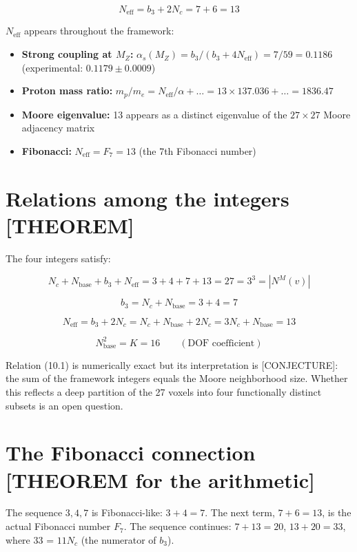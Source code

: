 \documentclass[
  11pt,
  letterpaper,
  twoside,
  openany]{book}
\makeatletter
\providecommand{\tightlist}{%
  \setlength{\itemsep}{0pt}\setlength{\parskip}{0pt}}
\let\orig@section\section
\renewcommand{\section}{\needspace{8\baselineskip}\orig@section}
\makeatother
\begin{document}
\[
N_{\text{eff}} = b_3 + 2N_c = 7 + 6 = 13
\]

\(N_{\text{eff}}\) appears throughout the framework:

\begin{itemize}
\tightlist
\item
  \textbf{Strong coupling at \(M_Z\):}
  \(\alpha_s(M_Z) = b_3 / (b_3 + 4N_{\text{eff}}) = 7/59 = 0.1186\)
  (experimental: \(0.1179 \pm 0.0009\))
\item
  \textbf{Proton mass ratio:}
  \(m_p/m_e = N_{\text{eff}}/\alpha + \ldots = 13 \times 137.036 + \ldots = 1836.47\)
\item
  \textbf{Moore eigenvalue:} 13 appears as a distinct eigenvalue of the
  \(27 \times 27\) Moore adjacency matrix
\item
  \textbf{Fibonacci:} \(N_{\text{eff}} = F_7 = 13\) (the 7th Fibonacci
  number)
\end{itemize}

\section{Relations among the integers
{[}THEOREM{]}}\label{relations-among-the-integers-theorem}

The four integers satisfy:

\[
N_c + N_{\text{base}} + b_3 + N_{\text{eff}} = 3 + 4 + 7 + 13 = 27 = 3^3 = |N^M(v)|
\tag{10.1}
\]

\[
b_3 = N_c + N_{\text{base}} = 3 + 4 = 7
\tag{10.2}
\]

\[
N_{\text{eff}} = b_3 + 2N_c = N_c + N_{\text{base}} + 2N_c = 3N_c + N_{\text{base}} = 13
\tag{10.3}
\]

\[
N_{\text{base}}^2 = K = 16 \qquad (\text{DOF coefficient})
\tag{10.4}
\]

Relation (10.1) is numerically exact but its interpretation is
{[}CONJECTURE{]}: the sum of the framework integers equals the Moore
neighborhood size. Whether this reflects a deep partition of the 27
voxels into four functionally distinct subsets is an open question.

\section{The Fibonacci connection {[}THEOREM for the
arithmetic{]}}\label{the-fibonacci-connection-theorem-for-the-arithmetic}

The sequence \(3, 4, 7\) is Fibonacci-like: \(3 + 4 = 7\). The next
term, \(7 + 6 = 13\), is the actual Fibonacci number \(F_7\). The
sequence continues: \(7 + 13 = 20\), \(13 + 20 = 33\), where 33 =
\(11 N_c\) (the numerator of \(b_3\)).
\end{document}
